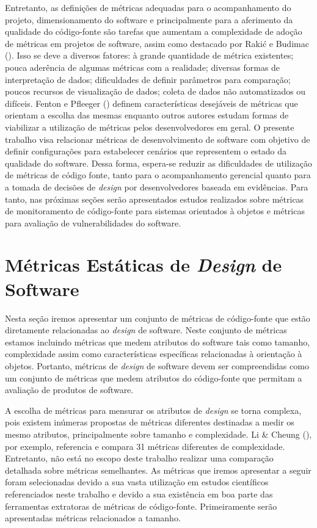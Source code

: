 Entretanto, as definições de métricas adequadas para o acompanhamento do projeto, dimensionamento do software e principalmente para a aferimento da qualidade do código-fonte são tarefas que aumentam a complexidade de adoção de métricas em projetos de software, assim como destacado por Rakić e Budimac (\citeyear{rakic2011budimac}).
%
Isso se deve a diversos fatores: à grande quantidade de métrica existentes; pouca aderência de algumas métricas com a realidade; diversas formas de interpretação de dados; dificuldades de definir parâmetros para comparação; poucos recursos de visualização de dados; coleta de dados não automatizados ou difíceis.
%
Fenton e Pfleeger (\citeyear{fenton1998}) definem características desejáveis de métricas que orientam a escolha das mesmas enquanto outros autores estudam formas de viabilizar a utilização de métricas pelos desenvolvedores em geral\cite{meirelles2013metrics,almeida2010}.
%
O presente trabalho visa relacionar métricas de desenvolvimento de software com objetivo de definir configurações para estabelecer cenários que representem o estado da qualidade do software. Dessa forma, espera-se reduzir as dificuldades de utilização de métricas de código fonte, tanto para o acompanhamento gerencial quanto para a tomada de decisões de \emph{design} por desenvolvedores baseada em evidências. Para tanto, nas próximas seções serão apresentados estudos realizados sobre métricas de monitoramento de código-fonte para sistemas orientados à objetos e métricas para avaliação de vulnerabilidades do software.

%

\section{Métricas Estáticas de \emph{Design} de Software}

Nesta seção iremos apresentar um conjunto de métricas de código-fonte que estão diretamente relacionadas ao \emph{design} de software. Neste conjunto de métricas estamos incluindo métricas que medem atributos do software tais como tamanho, complexidade assim como características específicas relacionadas à orientação à objetos. Portanto, métricas de \emph{design} de software devem ser compreendidas como um conjunto de métricas que medem atributos do código-fonte que permitam a avaliação de produtos de software.

%

A escolha de métricas para mensurar os atributos de \emph{design} se torna complexa, pois existem inúmeras propostas de métricas diferentes destinadas a medir os mesmo atributos, principalmente sobre tamanho e complexidade. Li \& Cheung (\citeyear{li1987}), por exemplo, referencia e compara 31 métricas diferentes de complexidade. Entretanto, não está no escopo deste trabalho realizar uma comparação detalhada sobre métricas semelhantes. As métricas que iremos apresentar a seguir foram selecionadas devido a sua vasta utilização em estudos científicos referenciados neste trabalho e devido a sua existência em boa parte das ferramentas extratoras de métricas de código-fonte. Primeiramente serão apresentadas métricas relacionados a tamanho.


